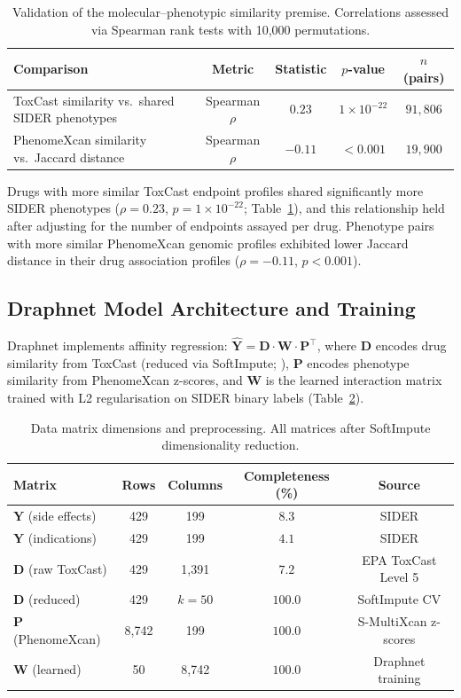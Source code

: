 \documentclass[11pt]{article}
\begin{document}
\begin{table}[H]
\centering
\caption{Validation of the molecular--phenotypic similarity premise. Correlations assessed via Spearman rank tests with 10,000 permutations.}
\label{tab:premise}
\begin{tabular}{lcccc}
\toprule
Comparison & Metric & Statistic & $p$-value & $n$ (pairs) \\
\midrule
ToxCast similarity vs.\ shared SIDER phenotypes & Spearman $\rho$ & $0.23$ & $1 \times 10^{-22}$ & $91,806$ \\
PhenomeXcan similarity vs.\ Jaccard distance & Spearman $\rho$ & $-0.11$ & $< 0.001$ & $19,900$ \\
\bottomrule
\end{tabular}
\end{table}

Drugs with more similar ToxCast endpoint profiles shared significantly more SIDER phenotypes ($\rho = 0.23$, $p = 1 \times 10^{-22}$; Table~\ref{tab:premise}), and this relationship held after adjusting for the number of endpoints assayed per drug. Phenotype pairs with more similar PhenomeXcan genomic profiles exhibited lower Jaccard distance in their drug association profiles ($\rho = -0.11$, $p < 0.001$).

\subsection{Draphnet Model Architecture and Training}

Draphnet implements affinity regression: $\hat{\mathbf{Y}} = \mathbf{D} \cdot \mathbf{W} \cdot \mathbf{P}^\top$, where $\mathbf{D}$ encodes drug similarity from ToxCast (reduced via SoftImpute; \citealt{mazumder2010spectral}), $\mathbf{P}$ encodes phenotype similarity from PhenomeXcan z-scores, and $\mathbf{W}$ is the learned interaction matrix trained with L2 regularisation on SIDER binary labels (Table~\ref{tab:data_dims}).

\begin{table}[H]
\centering
\caption{Data matrix dimensions and preprocessing. All matrices after SoftImpute dimensionality reduction.}
\label{tab:data_dims}
\begin{tabular}{lcccc}
\toprule
Matrix & Rows & Columns & Completeness (\%) & Source \\
\midrule
$\mathbf{Y}$ (side effects) & 429 & 199 & $8.3$ & SIDER \\
$\mathbf{Y}$ (indications) & 429 & 199 & $4.1$ & SIDER \\
$\mathbf{D}$ (raw ToxCast) & 429 & 1,391 & $7.2$ & EPA ToxCast Level 5 \\
$\mathbf{D}$ (reduced) & 429 & $k = 50$ & $100.0$ & SoftImpute CV \\
$\mathbf{P}$ (PhenomeXcan) & 8,742 & 199 & $100.0$ & S-MultiXcan z-scores \\
$\mathbf{W}$ (learned) & 50 & 8,742 & $100.0$ & Draphnet training \\
\bottomrule
\end{tabular}
\end{table}
\end{document}

